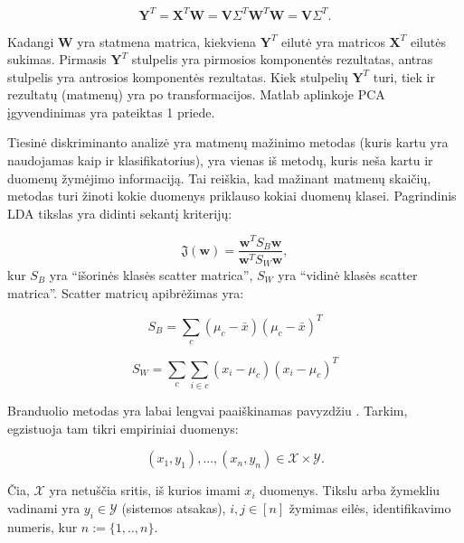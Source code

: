 \documentclass[]{vgtuef}
\begin{document}
\begin{equation}
  \mathbf{Y}^T = \mathbf{X}^T \mathbf{W} = \mathbf{V} \Sigma^T
  \mathbf{W}^T \mathbf{W} = \mathbf{V} \Sigma^T .
\end{equation}

Kadangi $\textbf{W}$ yra statmena matrica, kiekviena $\textbf{Y}^T$ eilutė yra matricos $\textbf{X}^T$ eilutės sukimas. Pirmasis $\textbf{Y}^T$ stulpelis yra pirmosios komponentės rezultatas, antras stulpelis yra antrosios komponentės rezultatas. Kiek stulpelių $\textbf{Y}^T$ turi, tiek ir rezultatų (matmenų) yra po transformacijos. Matlab aplinkoje PCA įgyvendinimas yra pateiktas 1 priede.

Tiesinė diskriminanto analizė \cite{welling2005fisher} yra matmenų mažinimo metodas (kuris kartu yra naudojamas kaip ir klasifikatorius), yra vienas iš metodų, kuris neša kartu ir duomenų žymėjimo informaciją. Tai reiškia, kad mažinant matmenų skaičių, metodas turi žinoti kokie duomenys priklauso kokiai duomenų klasei. Pagrindinis LDA tikslas yra didinti sekantį kriterijų:

\begin{equation}
  \mathfrak{J}(\mathbf{w}) = \frac{ \mathbf{w}^T S_B \mathbf{w} }{
    \mathbf{w}^T S_W \mathbf{w} },
\end{equation}
kur $S_B$ yra ``išorinės klasės scatter matrica'', $S_W$ yra ``vidinė klasės scatter matrica''. Scatter matricų apibrėžimas yra:

\begin{equation}
  S_B = \sum_c (\mu_c - \bar{x})(\mu_c - \bar{x})^T
\end{equation}

\begin{equation}
  S_W = \sum_c \sum_{i \in c} ( x_i - \mu_c)(x_i - \mu_c)^T
\end{equation}


Branduolio metodas yra labai lengvai paaiškinamas pavyzdžiu \cite{2007math......1907H}. Tarkim, egzistuoja tam tikri empiriniai duomenys:

\begin{equation}
  (x_1,y_1),...,(x_n,y_n) \in \mathcal{X} \times \mathcal{Y}.
\end{equation}

Čia, $\mathcal{X}$ yra netuščia sritis, iš kurios imami $x_i$ duomenys. Tikslu arba žymekliu vadinami yra $y_i \in \mathcal{Y}$ (sistemos atsakas), $i,j \in [n]$ žymimas eilės, identifikavimo numeris, kur $n := \{1,..,n\}$.
\end{document}
